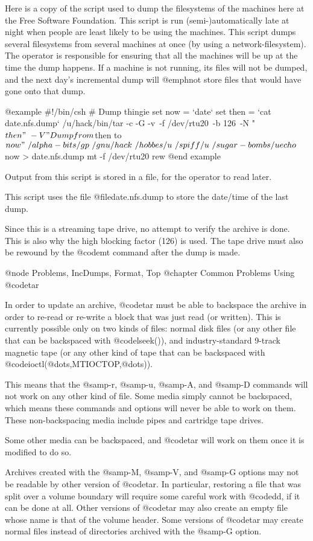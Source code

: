 Here is a copy of the script used to dump the filesystems of the
machines here at the Free Software Foundation.  This script is run
(semi-)automatically late at night when people are least likely to
be using the machines.  This script dumps several filesystems from
several machines at once (by using a network-filesystem).  The
operator is responsible for ensuring that all the machines will be
up at the time the dump happens.  If a machine is not running, its
files will not be dumped, and the next day's incremental dump will
@emph{not} store files that would have gone onto that dump.

@example
#!/bin/csh
# Dump thingie
set now = `date`
set then = `cat date.nfs.dump`
/u/hack/bin/tar -c -G -v\
 -f /dev/rtu20\
 -b 126\
 -N "$then"\
 -V "Dump from $then to $now"\
 /alpha-bits/gp\
 /gnu/hack\
 /hobbes/u\
 /spiff/u\
 /sugar-bombs/u
echo $now > date.nfs.dump
mt -f /dev/rtu20 rew
@end example

Output from this script is stored in a file, for the operator to
read later.

This script uses the file @file{date.nfs.dump} to store the date/time of
the last dump.

Since this is a streaming tape drive, no attempt to verify the
archive is done.  This is also why the high blocking factor (126) is
used.  The tape drive must also be rewound by the @code{mt} command
after the dump is made.

@node Problems, IncDumps, Format, Top
@chapter Common Problems Using @code{tar}

In order to update an archive, @code{tar} must be able to backspace
the archive in order to re-read or re-write a block that was just read
(or written).  This is currently possible only on two kinds of
files:  normal disk files (or any other file that can be
backspaced with @code{lseek()}), and industry-standard 9-track magnetic
tape (or any other kind of tape that can be backspaced with
@code{ioctl(@dots{},MTIOCTOP,@dots{})}).

This means that the @samp{-r}, @samp{-u}, @samp{-A}, and @samp{-D}
commands will not work on any other kind of file.  Some media simply
cannot be backspaced, which means these commands and options will
never be able to work on them.  These non-backspacing media include
pipes and cartridge tape drives.

Some other media can be backspaced, and @code{tar} will work on them
once it is modified to do so.

Archives created with the @samp{-M}, @samp{-V}, and @samp{-G}
options may not be readable by other version of @code{tar}.  In particular,
restoring a file that was split over a volume boundary will require
some careful work with @code{dd}, if it can be done at all.  Other versions
of @code{tar} may also create an empty file whose name is that of
the volume header.  Some versions of @code{tar} may create normal
files instead of directories archived with the @samp{-G} option.

